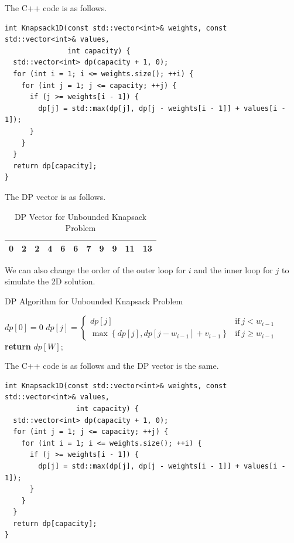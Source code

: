 The C++ code is as follows.
\begin{lstlisting}
int Knapsack1D(const std::vector<int>& weights, const std::vector<int>& values,
               int capacity) {
  std::vector<int> dp(capacity + 1, 0);
  for (int i = 1; i <= weights.size(); ++i) {
    for (int j = 1; j <= capacity; ++j) {
      if (j >= weights[i - 1]) {
        dp[j] = std::max(dp[j], dp[j - weights[i - 1]] + values[i - 1]);
      }
    }
  }
  return dp[capacity];
}
\end{lstlisting}

The DP vector is as follows.
\begin{table}[H]
\centering
\begin{tabular}{|c|c|c|c|c|c|c|c|c|c|c|}
\hline
0 & 2 & 2 & 4 & 6 & 6 & 7 & 9 & 9 & 11 & 13 \\
\hline
\end{tabular}
\caption{DP Vector for Unbounded Knapsack Problem}
\end{table}

We can also change the order of the outer loop for $i$ and the inner loop for $j$ to simulate the 2D solution.

\begin{algorithm}[H]
\caption{DP Algorithm for Unbounded Knapsack Problem}
\begin{algorithmic}[1]
\State $dp[0] = 0$ 
\For{{\color{blue}{$j = 1$ to $W$}}}
    \For{{\color{blue}{$i = 1$ to $n$}}}
        \State 
        $dp[j] = 
        \begin{cases} 
            dp[j] & \text{if}\ j < w_{i-1}\\
            \max\left\{dp[j], dp[j - w_{i-1}] + v_{i-1}\right\} & \text{if}\ j \geq w_{i-1} 
        \end{cases}$
    \EndFor
\EndFor
\State \textbf{return} $dp[W]$;
\end{algorithmic}
\end{algorithm}

The C++ code is as follows and the DP vector is the same.
\begin{lstlisting}
int Knapsack1D(const std::vector<int>& weights, const std::vector<int>& values,
                 int capacity) {
  std::vector<int> dp(capacity + 1, 0);
  for (int j = 1; j <= capacity; ++j) {
    for (int i = 1; i <= weights.size(); ++i) {
      if (j >= weights[i - 1]) {
        dp[j] = std::max(dp[j], dp[j - weights[i - 1]] + values[i - 1]);
      }
    }
  }
  return dp[capacity];
}
\end{lstlisting}

